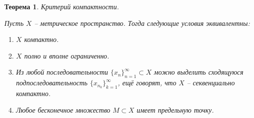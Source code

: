 \documentclass[a4paper,12pt]{article}
\theoremstyle{plain}
\newtheorem{theorem}{Теорема}[section]
\theoremstyle{definition}
\theoremstyle{remark}
\begin{document}
\begin{theorem}
	Критерий компактности.

	Пусть $X$ -- метрическое пространство. Тогда следующие условия эквивалентны:
	\begin{enumerate}
		\item $X$ компактно.
		\item $X$ полно и вполне ограниченно.
		\item Из любой последовательности $\{x_n\}_{n = 1}^\infty \subset X$ можно выделить сходящуюся подпоследовательность $\{x_{n_k}\}_{k = 1}^\infty$, ещё говорят, что $X$ -- секвенциально компактно.
		\item Любое бесконечное множество $M \subset X$ имеет предельную точку.
	\end{enumerate}
\end{theorem}
\end{document}
